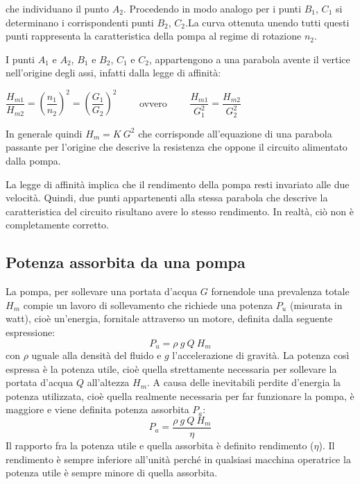 \documentclass[laurea,oneside,11pt]{USiena_tesiLM}
\begin{document}
che individuano il punto $A_2$. Procedendo in modo analogo per i punti $B_1$, $C_1$ si determinano i corrispondenti punti $B_2$, $C_2$.La curva ottenuta unendo tutti questi punti rappresenta la caratteristica della pompa al regime di rotazione $n_2$.

I punti $A_1$ e $A_2$, $B_1$ e $B_2$, $C_1$ e $C_2$, appartengono a una parabola avente il vertice nell'origine degli assi, infatti dalla legge di affinità:
\begin{center}
$\dfrac{H_{m1}}{H_{m2}}=\left(\dfrac{n_1}{n_2} \right)^2 = \left(\dfrac{G_1}{G_2} \right)^2  \qquad$ ovvero   $\qquad \dfrac{H_{m1}}{G_1^2}=\dfrac{H_{m2}}{G_2^2}$ 
\end{center}
In generale quindi $H_m = K \ G^2$ che corrisponde all'equazione di una parabola passante per l'origine che descrive la resistenza che oppone il circuito alimentato dalla pompa.

La legge di affinità implica che il rendimento della pompa resti invariato alle due velocità. Quindi, due punti appartenenti alla stessa parabola che descrive la caratteristica del circuito risultano avere lo stesso rendimento. In realtà, ciò non è completamente corretto.


\subsection{Potenza assorbita da una pompa}
La pompa, per sollevare una portata d'acqua $G$ fornendole una prevalenza totale $H_m$ compie un lavoro di sollevamento che richiede una potenza $P_u$ (misurata in watt), cioè un'energia, fornitale attraverso un motore, definita dalla seguente espressione:
\begin{equation}
P_u = \rho \ g \ Q \ H_m
\end{equation}
con $\rho$ uguale alla densità del fluido e $g$ l'accelerazione di gravità.
La potenza così espressa è la potenza utile, cioè quella strettamente necessaria per sollevare la portata d'acqua $Q$ all'altezza $H_m$. A causa delle inevitabili perdite d'energia la potenza utilizzata, cioè quella realmente necessaria per far funzionare la pompa, è maggiore e viene definita potenza assorbita $P_a$:
\begin{equation}
P_a = \dfrac{\rho \ g \ Q \ H_m}{\eta}
\label{eq:pot}
\end{equation}
Il rapporto fra la potenza utile e quella assorbita è definito rendimento ($\eta$). Il rendimento è sempre inferiore all'unità perché in qualsiasi macchina operatrice la potenza utile è sempre minore di quella assorbita. 
\end{document}
